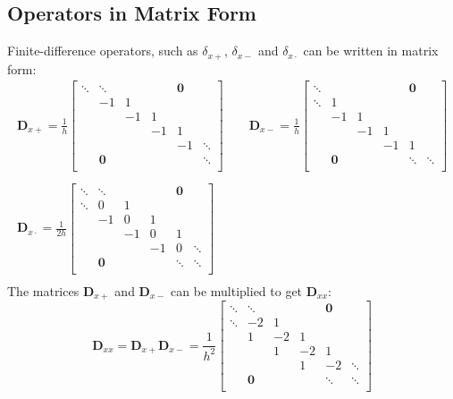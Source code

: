 \documentclass{article}
\def\Dxx{\mathbf{D}_{xx}}
\begin{document}
\subsection{Operators in Matrix Form}
Finite-difference operators, such as $\delta_{x+}$,  $\delta_{x-}$ and $\delta_{x\cdot}$ can be written in matrix form:
\begin{gather*}
    \mathbf{D}_{x+} = \frac{1}{h}\begin{bmatrix}
        \ddots &\ddots & & & \mathbf{0}&\\
         & -1 & 1 & & & \\
        & & -1 & 1 & & \\
        & & & -1 & 1 & \\
        & & & & -1 & \ddots\\
        &\mathbf{0} & & & & \ddots \\
    \end{bmatrix}
    \qquad
    \mathbf{D}_{x-} = \frac{1}{h}\begin{bmatrix}
        \ddots & & & & \mathbf{0}&\\
        \ddots & 1 & & & & \\
        & -1 & 1 & & & \\
        & & -1 & 1 & & \\
        & & & -1 & 1 & \\
        &\mathbf{0} & & & \ddots & \ddots \\
    \end{bmatrix}\\
    \\
    \mathbf{D}_{x\cdot} = \frac{1}{2h}\begin{bmatrix}
        \ddots &\ddots & & & \mathbf{0}&\\
        \ddots & 0 & 1 & & & \\
        & -1 & 0 & 1 & & \\
        & & -1 & 0 & 1 & \\
        & & & -1 & 0 & \ddots \\
        &\mathbf{0} & & & \ddots & \ddots \\
    \end{bmatrix}\\
\end{gather*}
The matrices $\mathbf{D}_{x+}$ and $\mathbf{D}_{x-}$ can be multiplied to get $\Dxx$:
\begin{equation}
    \Dxx = \mathbf{D}_{x+}\mathbf{D}_{x-} = \frac{1}{h^2}\begin{bmatrix}
        \ddots &\ddots & & & \mathbf{0}&\\
        \ddots & -2 & 1 & & & \\
        & 1 & -2 & 1 & & \\
        & & 1 & -2 & 1 & \\
        & & & 1 & -2 & \ddots \\
        &\mathbf{0} & & & \ddots & \ddots \\
    \end{bmatrix}
\end{equation}
\end{document}
